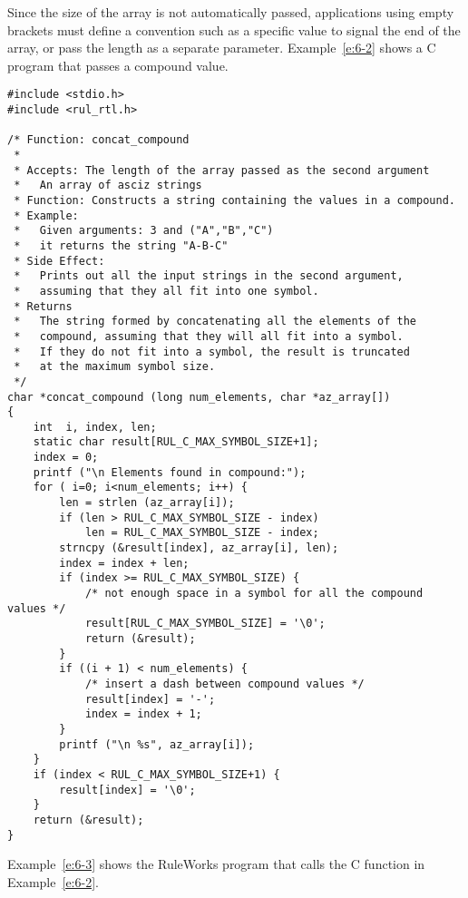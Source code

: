Since the size of the array is not automatically passed, applications
using empty brackets must define a convention such as a specific value
to signal the end of the array, or pass the length as a separate
parameter. Example~\ref{e:6-2} shows a C program that passes a
compound value.

\begin{exampl}
\begin{verbatim}
#include <stdio.h>
#include <rul_rtl.h>

/* Function: concat_compound
 *
 * Accepts: The length of the array passed as the second argument
 *   An array of asciz strings
 * Function: Constructs a string containing the values in a compound.
 * Example:
 *   Given arguments: 3 and ("A","B","C")
 *   it returns the string "A-B-C"
 * Side Effect:
 *   Prints out all the input strings in the second argument,
 *   assuming that they all fit into one symbol.
 * Returns
 *   The string formed by concatenating all the elements of the
 *   compound, assuming that they will all fit into a symbol.
 *   If they do not fit into a symbol, the result is truncated
 *   at the maximum symbol size.
 */
char *concat_compound (long num_elements, char *az_array[])
{
    int  i, index, len;
    static char result[RUL_C_MAX_SYMBOL_SIZE+1];
    index = 0;
    printf ("\n Elements found in compound:");
    for ( i=0; i<num_elements; i++) {
        len = strlen (az_array[i]);
        if (len > RUL_C_MAX_SYMBOL_SIZE - index)
            len = RUL_C_MAX_SYMBOL_SIZE - index;
        strncpy (&result[index], az_array[i], len);
        index = index + len;
        if (index >= RUL_C_MAX_SYMBOL_SIZE) {
            /* not enough space in a symbol for all the compound values */
            result[RUL_C_MAX_SYMBOL_SIZE] = '\0';
            return (&result);
        }
        if ((i + 1) < num_elements) {
            /* insert a dash between compound values */
            result[index] = '-';
            index = index + 1;
        }
        printf ("\n %s", az_array[i]);
    }
    if (index < RUL_C_MAX_SYMBOL_SIZE+1) {
        result[index] = '\0';
    }
    return (&result);
}
\end{verbatim}
\label{e:6-2}
\end{exampl}

Example~\ref{e:6-3} shows the RuleWorks program that calls the C function in
Example~\ref{e:6-2}.

